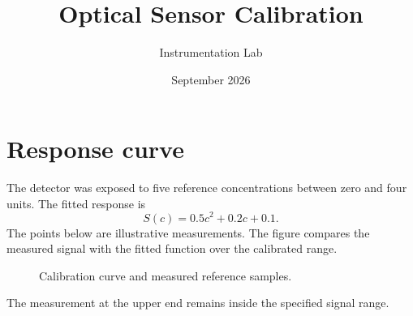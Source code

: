 \documentclass{article}
\title{Optical Sensor Calibration}
\author{Instrumentation Lab}
\date{September 2026}
\begin{document}
\maketitle

\section{Response curve}
The detector was exposed to five reference concentrations between zero and
four units. The fitted response is
\begin{equation}
S(c) = 0.5c^2 + 0.2c + 0.1.
\end{equation}
The points below are illustrative measurements. The figure compares the
measured signal with the fitted function over the calibrated range.

\begin{figure}
\centering
{}
\caption{Calibration curve and measured reference samples.}
\label{fig:calibration}
\end{figure}

The measurement at the upper end remains inside the specified signal range.
\end{document}

